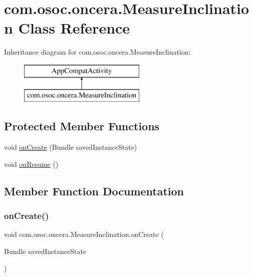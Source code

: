 \hypertarget{classcom_1_1osoc_1_1oncera_1_1_measure_inclination}{}\section{com.\+osoc.\+oncera.\+Measure\+Inclination Class Reference}
\label{classcom_1_1osoc_1_1oncera_1_1_measure_inclination}
Inheritance diagram for com.\+osoc.\+oncera.\+Measure\+Inclination\+:\begin{figure}[H]
\begin{center}
\leavevmode
\includegraphics[height=2.000000cm]{classcom_1_1osoc_1_1oncera_1_1_measure_inclination}
\end{center}
\end{figure}
\subsection*{Protected Member Functions}
\begin{DoxyCompactItemize}
\item 
void \mbox{\hyperlink{classcom_1_1osoc_1_1oncera_1_1_measure_inclination_a9ebd90c197ab59e71cb0c6444165aa3e}{on\+Create}} (Bundle saved\+Instance\+State)
\item 
void \mbox{\hyperlink{classcom_1_1osoc_1_1oncera_1_1_measure_inclination_a952bcfc81db2b66b95e255abe8c87224}{on\+Resume}} ()
\end{DoxyCompactItemize}


\subsection{Member Function Documentation}
\mbox{\label{classcom_1_1osoc_1_1oncera_1_1_measure_inclination_a9ebd90c197ab59e71cb0c6444165aa3e}} 
\subsubsection{\texorpdfstring{onCreate()}{onCreate()}}
{\footnotesize\ttfamily void com.\+osoc.\+oncera.\+Measure\+Inclination.\+on\+Create (\begin{DoxyParamCaption}\item[{Bundle}]{saved\+Instance\+State }\end{DoxyParamCaption})\hspace{0.3cm}{\ttfamily [protected]}}

